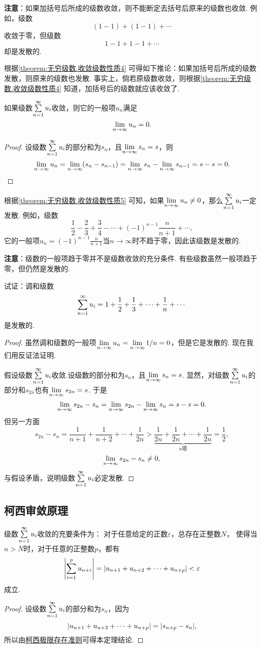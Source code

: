 \textbf{注意}：如果加括号后所成的级数收敛，则不能断定去括号后原来的级数也收敛.
例如，级数\[
(1-1)+(1-1)+\dotsb
\]收敛于零，但级数\[
1-1+1-1+\dotsb
\]却是发散的.

根据\cref{theorem:无穷级数.收敛级数性质4} 可得如下推论：{\color{red}如果加括号后所成的级数发散，则原来的级数也发散.}
事实上，倘若原级数收敛，则根据\cref{theorem:无穷级数.收敛级数性质4} 知道，加括号后的级数就应该收敛了.

\begin{property}[级数收敛的必要条件]\label{theorem:无穷级数.收敛级数性质5}
如果级数\(\sum\limits_{n=1}^{\infty} u_i\)收敛，则它的一般项\(u_n\)满足\[
\lim\limits_{n\to\infty} u_n = 0.
\]
\begin{proof}
设级数\(\sum\limits_{n=1}^{\infty} u_i\)的部分和为\(s_n\)，且\(\lim\limits_{n\to\infty} s_n = s\)，则\[
\lim\limits_{n\to\infty} u_n = \lim\limits_{n\to\infty}(s_n - s_{n-1}) = \lim\limits_{n\to\infty} s_n - \lim\limits_{n\to\infty} s_{n-1} = s - s = 0.
\qedhere
\]
\end{proof}
\end{property}

根据\cref{theorem:无穷级数.收敛级数性质5} 可知，如果\(\lim\limits_{n\to\infty} u_n \neq 0\)，那么\(\sum\limits_{n=1}^{\infty} u_i\)一定发散.
例如，级数\[
\frac{1}{2}-\frac{2}{3}+\frac{3}{4}-\dotsb+(-1)^{n-1}\frac{n}{n+1}+\dotsb,
\]它的一般项\(u_n = (-1)^{n-1} \frac{n}{n+1}\)当\(n\to\infty\)时不趋于零，因此该级数是发散的.

\textbf{注意}：级数的一般项趋于零并不是级数收敛的充分条件.
有些级数虽然一般项趋于零，但仍然是发散的.
\begin{example}\label{example:无穷级数.调和级数的收敛性}
试证：调和级数\[
\sum\limits_{n=1}^{\infty} u_i = 1+\frac{1}{2}+\frac{1}{3}+\dotsb+\frac{1}{n}+\dotsb
\]是发散的.
\begin{proof}
虽然调和级数的一般项\(\lim\limits_{n\to\infty} u_n = \lim\limits_{n\to\infty} 1/n = 0\)，但是它是发散的.
现在我们用反证法证明.

假设级数\(\sum\limits_{n=1}^{\infty} u_i\)收敛.设级数的部分和为\(s_n\)，且\(\lim\limits_{n\to\infty} s_n = s\).
显然，对级数\(\sum\limits_{n=1}^{\infty} u_i\)的部分和\(s_{2n}\)也有\(\lim\limits_{n\to\infty} s_{2n} = s\).
于是\[
\lim\limits_{n\to\infty} {s_{2n}-s_n} = \lim\limits_{n\to\infty} s_{2n} - \lim\limits_{n\to\infty} s_n = s - s = 0.
\]但另一方面\[
s_{2n} - s_n = \frac{1}{n+1}+\frac{1}{n+2}+\dotsb+\frac{1}{2n}
> \underbrace{\frac{1}{2n}+\frac{1}{2n}+\dotsb+\frac{1}{2n}}_{n\text{项}}
= \frac{1}{2},
\]\[
\lim\limits_{n\to\infty} {s_{2n}-s_n} \neq 0,
\]与假设矛盾，说明级数\(\sum\limits_{n=1}^{\infty} u_i\)必定发散.
\end{proof}
\end{example}

\subsection{柯西审敛原理}
\begin{theorem}[柯西审敛原理]\label{theorem:无穷级数.级数的柯西审敛原理}
级数\(\sum\limits_{n=1}^{\infty} u_i\)收敛的充要条件为：
对于任意给定的正数\(\varepsilon\)，总存在正整数\(N\)，%
使得当\(n>N\)时，对于任意的正整数\(p\)，都有\[
\abs{ \sum\limits_{i=1}^p u_{n+i} }
= \abs{u_{n+1}+u_{n+2}+\dotsb+u_{n+p}}
< \varepsilon
\]成立.
\begin{proof}
设级数\(\sum\limits_{n=1}^{\infty} u_i\)的部分和为\(s_n\)，因为\[
\abs{u_{n+1}+u_{n+2}+\dotsb+u_{n+p}} = \abs{s_{n+p}-s_n},
\]所以由\hyperref[theorem:极限.数列的柯西极限存在准则]{柯西极限存在准则}可得本定理结论.
\end{proof}
\end{theorem}


